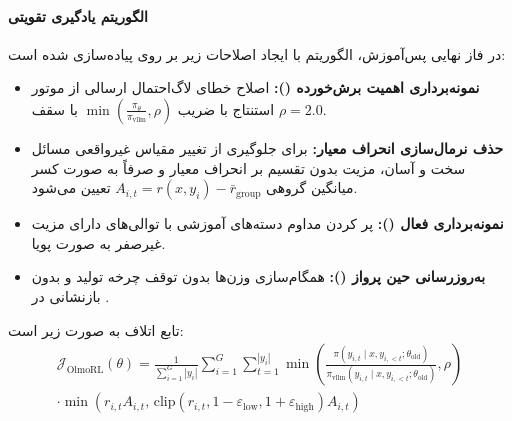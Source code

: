 \paragraph*{الگوریتم یادگیری تقویتی }
در فاز نهایی پس‌آموزش، الگوریتم  با ایجاد اصلاحات زیر بر روی  پیاده‌سازی شده است:
\begin{itemize}
    \item \textbf{نمونه‌برداری اهمیت برش‌خورده ():} اصلاح خطای لاگ‌احتمال ارسالی از موتور استنتاج با ضریب $\min(\frac{\pi_\theta}{\pi_{\text{vllm}}}, \rho)$ با سقف $\rho = 2.0$.
    \item \textbf{حذف نرمال‌سازی انحراف معیار:} برای جلوگیری از تغییر مقیاس غیرواقعی مسائل سخت و آسان، مزیت بدون تقسیم بر انحراف معیار و صرفاً به صورت کسر میانگین گروهی $A_{i,t} = r(x, y_i) - \bar{r}_{\text{group}}$ تعیین می‌شود.
    \item \textbf{نمونه‌برداری فعال ():} پر کردن مداوم دسته‌های آموزشی با توالی‌های دارای مزیت غیرصفر به صورت پویا.
    \item \textbf{به‌روزرسانی حین پرواز ():} همگام‌سازی وزن‌ها بدون توقف چرخه تولید و بدون بازنشانی  در .
\end{itemize}
تابع اتلاف  به صورت زیر است:
\begin{equation}
\begin{split}
    \mathcal{J}_{\text{OlmoRL}}(\theta) = \frac{1}{\sum_{i=1}^G |y_i|} \sum_{i=1}^G \sum_{t=1}^{|y_i|} \min\left( \frac{\pi(y_{i,t} \mid x, y_{i,<t}; \theta_{\text{old}})}{\pi_{\text{vllm}}(y_{i,t} \mid x, y_{i,<t}; \theta_{\text{old}})}, \rho \right) \\
    \cdot \min\left(r_{i,t} A_{i,t}, \, \text{clip}(r_{i,t}, 1 - \varepsilon_{\text{low}}, 1 + \varepsilon_{\text{high}}) A_{i,t}\right)
\end{split}
\end{equation}

